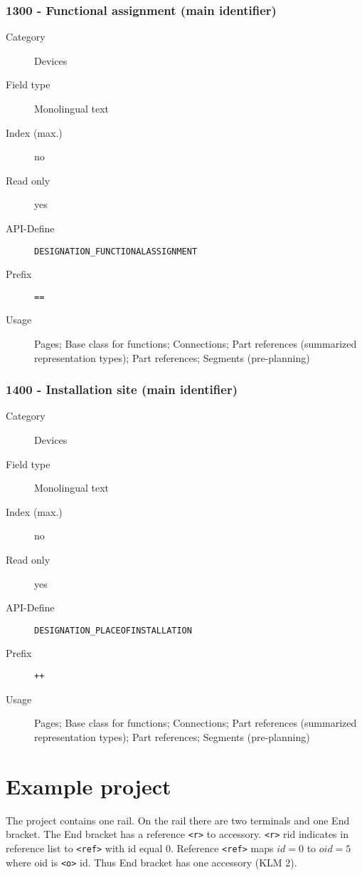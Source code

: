\documentclass[%
	a4paper,
	oneside,
	listof=numbered,
	parskip=half,
	headsepline=true,
	footsepline=false,
	normalheadings,
	0.7headlines,
	headexclude,
	]{scrbook}
\begin{document}
\subsection{1300 - Functional assignment (main identifier)}

\begin{description}
	\item[Category] Devices
	\item[Field type] Monolingual text
	\item[Index (max.)] no
	\item[Read only] yes
	\item[API-Define] \verb|DESIGNATION_FUNCTIONALASSIGNMENT|
	\item[Prefix] \verb|==|
	\item[Usage] Pages; Base class for functions; Connections; Part references (summarized representation types); Part references; Segments (pre-planning)
\end{description}

\subsection{1400 - Installation site (main identifier)}

\begin{description}
	\item[Category] Devices
	\item[Field type] Monolingual text
	\item[Index (max.)] no
	\item[Read only] yes
	\item[API-Define] \verb|DESIGNATION_PLACEOFINSTALLATION|
	\item[Prefix] \verb|++|
	\item[Usage] Pages; Base class for functions; Connections; Part references (summarized representation types); Part references; Segments (pre-planning)
\end{description}

\chapter{Example project}



The project contains one rail.
On the rail there are two terminals and one End bracket.
The End bracket has a reference \verb|<r>| to accessory.
\verb|<r>| rid indicates in reference list to \verb|<ref>| with id equal $0$.
Reference \verb|<ref>| maps $id=0$ to $oid=5$ where oid is \verb|<o>| id.
Thus End bracket has one accessory (KLM 2).
\end{document}
